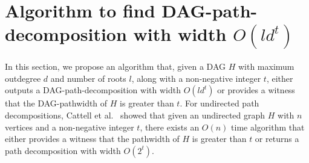\documentclass[runningheads]{llncs}
\theoremstyle{plain}
\theoremstyle{definition}
\begin{document}
\section{Algorithm to find DAG-path-decomposition with width $O(ld^t)$}\label{chapter5}


In this section, we propose an algorithm that, given a DAG $H$ with maximum outdegree $d$ and number of roots $l$, along with a non-negative integer $t$, either outputs a DAG-path-decomposition with width $O(ld^t)$ or provides a witness that the DAG-pathwidth of $H$ is greater than $t$. For undirected path decompositions, Cattell et al.~\cite{art8} showed that given an undirected graph $H$ with $n$ vertices and a non-negative integer $t$, there exists an $O(n)$ time algorithm that either provides a witness that the pathwidth of $H$ is greater than $t$ or returns a path decomposition with width $O(2^t)$.

\end{document}
